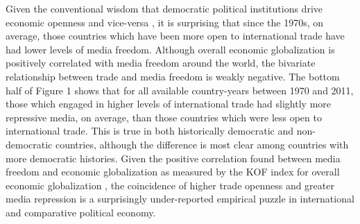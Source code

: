 \documentclass[12pt,a4paper]{article}\usepackage[]{graphicx}\usepackage[]{color}
\begin{document}
\vspace{0.3cm}

Given the conventional wisdom that democratic political institutions drive economic openness \parencite{Milner:2005ci} and vice-versa \parencite{EICHENGREEN:2008gg}, it is surprising that since the 1970s, on average, those countries which have been more open to international trade have had lower levels of media freedom. Although overall economic globalization is positively correlated with media freedom around the world, the bivariate relationship between trade and media freedom is weakly negative. The bottom half of Figure 1 shows that for all available country-years between 1970 and 2011, those which engaged in higher levels of international trade had slightly more repressive media, on average, than those countries which were less open to international trade. This is true in both historically democratic and non-democratic countries, although the difference is most clear among countries with more democratic histories. Given the positive correlation found between media freedom and economic globalization as measured by the KOF index for overall economic globalization \parencite{Dreher:2008dg}, the coincidence of higher trade openness and greater media repression is a surprisingly under-reported empirical puzzle in international and comparative political economy.
\end{document}
